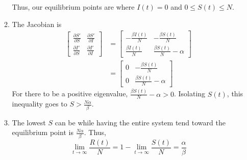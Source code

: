 \documentclass[12pt]{article}
\begin{document}
\begin{enumerate}
\begin{enumerate}
                    Thus, our equilibrium points are where $I(t)=0$ and $0 \le S(t) \le N$.
              \item The Jacobian is
                    \begin{align*}
                        \begin{bmatrix}
                            \frac{\partial S'}{\partial S} & \frac{\partial S'}{\partial I} \\
                            \frac{\partial I'}{\partial S} & \frac{\partial I'}{\partial I}
                        \end{bmatrix}
                         & =\begin{bmatrix}
                                -\frac{\beta I(t)}{N} & -\frac{\beta S(t)}{N}       \\
                                \frac{\beta I(t)}{N}  & \frac{\beta S(t)}{N}-\alpha
                            \end{bmatrix} \\
                         & =\begin{bmatrix}
                                0 & -\frac{\beta S(t)}{N}       \\
                                0 & \frac{\beta S(t)}{N}-\alpha
                            \end{bmatrix}
                    \end{align*}
                    For there to be a positive eigenvalue, $\frac{\beta S(t)}{N}-\alpha > 0$.
                    Isolating $S(t)$, this inequality goes to $\boxed{S > \frac{N\alpha}{\beta}}$.
              \item The lowest $S$ can be while having the entire system
                    tend toward the equilibrium point is $\frac{N\alpha}{\beta}$.
                    Thus, \[\lim_{t \to \infty} \frac{R(t)}{N}=1-\lim_{t \to \infty} \frac{S(t)}{N}=\boxed{\frac{\alpha}{\beta}}\]
          \end{enumerate}
\end{enumerate}
\end{document}
